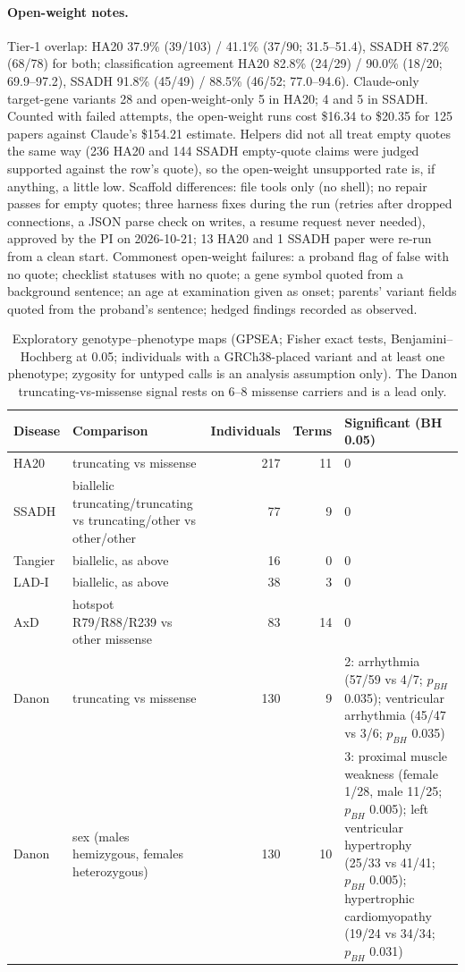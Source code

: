 \documentclass{article} %
\begin{document}
\paragraph{Open-weight notes.} Tier-1 overlap: HA20 37.9\% (39/103) / 41.1\% (37/90; 31.5--51.4), SSADH 87.2\% (68/78) for both; classification agreement HA20 82.8\% (24/29) / 90.0\% (18/20; 69.9--97.2), SSADH 91.8\% (45/49) / 88.5\% (46/52; 77.0--94.6). Claude-only target-gene variants 28 and open-weight-only 5 in HA20; 4 and 5 in SSADH. Counted with failed attempts, the open-weight runs cost \$16.34 to \$20.35 for 125 papers against Claude's \$154.21 estimate. Helpers did not all treat empty quotes the same way (236 HA20 and 144 SSADH empty-quote claims were judged supported against the row's quote), so the open-weight unsupported rate is, if anything, a little low. Scaffold differences: file tools only (no shell); no repair passes for empty quotes; three harness fixes during the run (retries after dropped connections, a JSON parse check on writes, a resume request never needed), approved by the PI on 2026-10-21; 13 HA20 and 1 SSADH paper were re-run from a clean start. Commonest open-weight failures: a proband flag of false with no quote; checklist statuses with no quote; a gene symbol quoted from a background sentence; an age at examination given as onset; parents' variant fields quoted from the proband's sentence; hedged findings recorded as observed.

\begin{table}[!htbp]
\caption{Exploratory genotype--phenotype maps (GPSEA; Fisher exact tests, Benjamini--Hochberg at 0.05; individuals with a GRCh38-placed variant and at least one phenotype; zygosity for untyped calls is an analysis assumption only). The Danon truncating-vs-missense signal rests on 6--8 missense carriers and is a lead only.}
\begin{center}
\scriptsize
\begin{tabular}{lL{3.6cm}rrL{4.6cm}}
\toprule
Disease & Comparison & Individuals & Terms & Significant (BH 0.05) \\
\midrule
HA20 & truncating vs missense & 217 & 11 & 0 \\
SSADH & biallelic truncating/truncating vs truncating/other vs other/other & 77 & 9 & 0 \\
Tangier & biallelic, as above & 16 & 0 & 0 \\
LAD-I & biallelic, as above & 38 & 3 & 0 \\
AxD & hotspot R79/R88/R239 vs other missense & 83 & 14 & 0 \\
Danon & truncating vs missense & 130 & 9 & 2: arrhythmia (57/59 vs 4/7; $p_{BH}$ 0.035); ventricular arrhythmia (45/47 vs 3/6; $p_{BH}$ 0.035) \\
Danon & sex (males hemizygous, females heterozygous) & 130 & 10 & 3: proximal muscle weakness (female 1/28, male 11/25; $p_{BH}$ 0.005); left ventricular hypertrophy (25/33 vs 41/41; $p_{BH}$ 0.005); hypertrophic cardiomyopathy (19/24 vs 34/34; $p_{BH}$ 0.031) \\
\bottomrule
\end{tabular}
\end{center}
\end{table}
\end{document}
